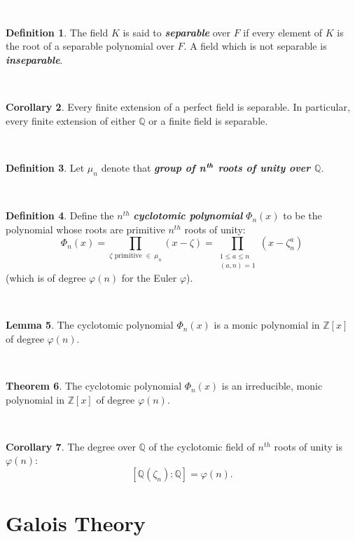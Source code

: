 \documentclass{article}
\theoremstyle{definition}
\newtheorem{thm}{Theorem}[section]
\newtheorem{lem}[thm]{Lemma}
\newtheorem{cor}[thm]{Corollary}
\newtheorem{defn}[thm]{Definition}
\newcommand{\nl}{\textcolor{white}{nothing}}
\newcommand{\Q}{\mathbb{Q}}
\newcommand{\Z}{\mathbb{Z}}
\newcommand{\vphi}{\varphi}
\begin{document}
\nl

\begin{defn}
The field $K$ is said to \textit{\textbf{separable}} over $F$ if every element of $K$ is the root of a separable polynomial over $F$. A field which is not separable is \textit{\textbf{inseparable}}.
\end{defn}

\nl

\begin{cor}
Every finite extension of a perfect field is separable. In particular, every finite extension of either $\Q$ or a finite field is separable.
\end{cor}

\nl

\begin{defn}
Let $\mu_n$ denote that \textit{\textbf{group of n$^{\textbf{\textit{th}}}$ roots of unity over $\Q$}}.
\end{defn}

\nl

\begin{defn}
Define the $n^{th}$ \textit{\textbf{cyclotomic polynomial}} $\Phi_n(x)$ to be the polynomial whose roots are primitive $n^{th}$ roots of unity:
\[\Phi_n(x) = \prod_{\zeta\text{ primitive }\in\ \mu_n}(x - \zeta) = \prod_{\substack{1 \leq a \leq n \\ (a,n) = 1}} (x - \zeta_n^a)\]
(which is of degree $\vphi(n)$ for the Euler $\vphi$).
\end{defn}

\nl

\begin{lem}
The cyclotomic polynomial $\Phi_n(x)$ is a monic polynomial in $\Z[x]$ of degree $\vphi(n)$.
\end{lem}

\nl

\begin{thm}
The cyclotomic polynomial $\Phi_n(x)$ is an irreducible, monic polynomial in $\Z[x]$ of degree $\vphi(n)$.
\end{thm}

\nl

\begin{cor}
The degree over $\Q$ of the cyclotomic field of $n^{th}$ roots of unity is $\vphi(n)$:
\[[\Q(\zeta_n): \Q] = \vphi(n).\]
\end{cor}



\section{Galois Theory}
\setcounter{thm}{0}
\end{document}
